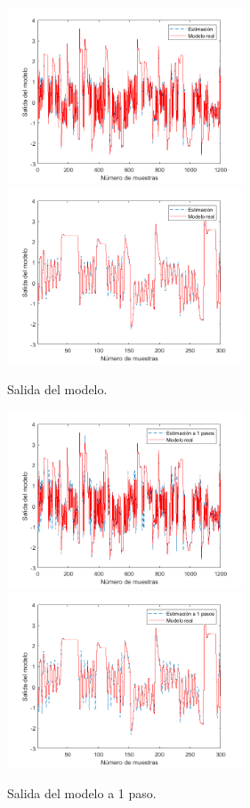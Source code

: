 \documentclass[12pt]{article}
\begin{document}
\begin{figure}
\centering
\caption{Salida del modelo.}
\includegraphics[width=7cm]{imag/P1Salida}
\includegraphics[width=7cm]{imag/P1SalidaZoom}
\label{f_SalidaModelo}
\end{figure}

\begin{figure}
\centering
\caption{Salida del modelo a 1 paso.}
\includegraphics[width=7cm]{imag/P1Salida_p1}
\includegraphics[width=7cm]{imag/P1Salida_p1Zoom}
\label{f_SalidaModelop1}
\end{figure}
\end{document}
